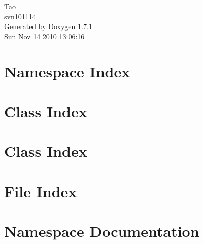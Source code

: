 \documentclass[a4paper]{book}
\begin{document}
\hypersetup{pageanchor=false}
\begin{titlepage}
\vspace*{7cm}
\begin{center}
{\Large Tao \\[1ex]\large svn101114 }\\
\vspace*{1cm}
{\large Generated by Doxygen 1.7.1}\\
\vspace*{0.5cm}
{\small Sun Nov 14 2010 13:06:16}\\
\end{center}
\end{titlepage}
\clearemptydoublepage
{}
\tableofcontents
\clearemptydoublepage
{}
\hypersetup{pageanchor=true}
\chapter{Namespace Index}

\chapter{Class Index}

\chapter{Class Index}

\chapter{File Index}

\chapter{Namespace Documentation}



























\end{document}
